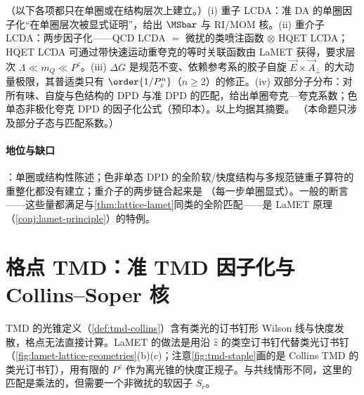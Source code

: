 \begin{proposition}\label{prop:lamet-other-objects}
（以下各项都只在单圈或在结构层次上建立。）(i) 重子 LCDA：准 DA 的单圈因子化“在单圈层次被显式证明”，给出 $\MSbar$ 与 RI/MOM 核\cite{Deng:2023csv}。(ii) 重介子 LCDA：两步因子化——QCD LCDA $=$ 微扰的类喷注函数 $\otimes$ HQET LCDA\cite{Beneke:2023nmj}；HQET LCDA 可通过带快速运动重夸克的等时关联函数由 LaMET 获得\cite{Han:2024fkr}，要求层次 $\Lambda\ll m_Q\ll P^z$。(iii) $\Delta G$ 是规范不变、依赖参考系的胶子自旋 $\vec E\times\vec A_\perp$ 的大动量极限\cite{Ji:2013fga}，其普适类只有 $\order{1/P_z^n}$（$n\ge2$）的修正\cite{Hatta:2013gta}。(iv) 双部分子分布：对所有味、自旋与色结构的 DPD 与准 DPD 的匹配，给出单圈夸克—夸克系数\cite{Jaarsma:2023woo}；色单态非极化夸克 DPD 的因子化公式\cite{Zhang:2023wea}（预印本）。以上均据其摘要。
（本命题只涉及部分子态与匹配系数。）
\end{proposition}

\paragraph{地位与缺口}
\tagP：单圈或结构性陈述；色非单态 DPD 的全阶软/快度结构与多规范链重子算符的重整化都没有建立；重介子的两步链合起来是 \tagP（每一步单圈显式）。一般的断言——这些量都满足与\cref{thm:lattice-lamet}同类的全阶匹配——是 LaMET 原理（\cref{conj:lamet-principle}）的特例。

\section{格点 TMD：准 TMD 因子化与 Collins--Soper 核}\label{sec:lattice-tmd}

TMD 的光锥定义（\cref{def:tmd-collins}）含有类光的订书钉形 Wilson 线与快度发散，格点无法直接计算。LaMET 的做法是用沿 $\hat z$ 的类空订书钉代替类光订书钉（\cref{fig:lamet-lattice-geometries}(b)(c)；注意\cref{fig:tmd-staple}画的是 Collins TMD 的类光订书钉），用有限的 $P^z$ 作为离光锥的快度正规子。与共线情形不同，这里的匹配是乘法的，但需要一个非微扰的软因子 $S_r$。

